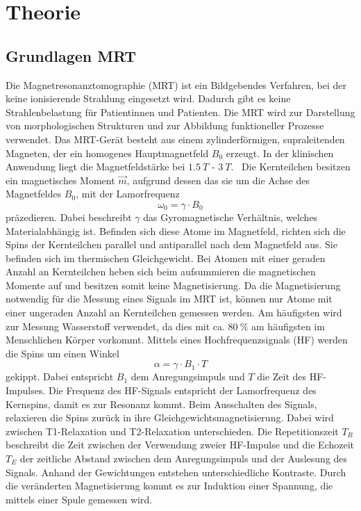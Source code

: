\chapter{Theorie}

\section{Grundlagen MRT}
Die Magnetresonanztomographie (MRT) ist ein Bildgebendes Verfahren, bei der keine ionisierende Strahlung eingesetzt wird.
Dadurch gibt es keine Strahlenbelastung für Patientinnen und Patienten.
Die MRT wird zur Darstellung von morphologischen Strukturen und zur Abbildung funktioneller Prozesse verwendet.
Das MRT-Gerät besteht aus einem zylinderförmigen, supraleitenden Magneten, der ein homogenes Hauptmagnetfeld $B_0$ erzeugt. %
In der klinischen Anwendung liegt die Magnetfeldstärke bei $\qty{1.5}{T}$ - $\qty{3}{T}$.~\cite{Schlegel}
Die Kernteilchen besitzen ein magnetisches Moment $\vec{m}$, aufgrund dessen das sie um die Achse des Magnetfeldes $B_0$, mit der Lamorfrequenz 
\begin{equation}
    \omega_0 = \gamma \cdot B_0
\end{equation}
präzedieren. Dabei beschreibt $\gamma$ das Gyromagnetische Verhältnis, welches Materialabhängig ist.
Befinden sich diese Atome im Magnetfeld,
richten sich die Spins der Kernteilchen parallel und antiparallel nach dem Magnetfeld aus. Sie befinden sich im thermischen Gleichgewicht.
Bei Atomen mit einer geraden Anzahl an Kernteilchen heben sich beim aufsummieren die magnetischen Momente auf und besitzen somit keine
Magnetisierung. 
Da die Magnetisierung notwendig für die Messung eines Signals im MRT ist, können nur Atome mit einer ungeraden Anzahl an Kernteilchen gemessen werden.
Am häufigsten wird zur Messung Wasserstoff verwendet, da dies mit ca. $\qty{80}{\%}$ am häufigsten im Menschlichen Körper vorkommt.
Mittels eines Hochfrequenzsignals (HF) werden die Spins um einen Winkel
\begin{equation}
    \alpha = \gamma \cdot B_1 \cdot T 
\end{equation}
gekippt. Dabei entspricht $B_1$ dem Anregungsimpuls und $T$ die Zeit des HF-Impulses.
Die Frequenz des HF-Signals entspricht der Lamorfrequenz des Kernspins, damit es zur Resonanz kommt. 
Beim Ausschalten des Signals, relaxieren die Spins zurück in ihre Gleichgewichtsmagnetisierung. 
Dabei wird zwischen T1-Relaxation und T2-Relaxation unterschieden. 
Die Repetitionszeit $T_R$ beschreibt die Zeit zwischen der Verwendung zweier HF-Impulse und die Echozeit $T_E$ der zeitliche Abstand zwischen dem Anregungsimpuls und der Auslesung des Signals. 
Anhand der Gewichtungen entstehen unterschiedliche Kontraste.
Durch die veränderten Magnetisierung kommt es zur Induktion einer Spannung, die mittels einer Spule gemessen wird.~\cite{Pollmann}



